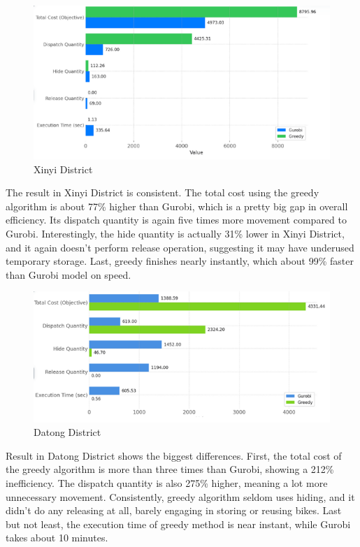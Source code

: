 \documentclass[11pt,a4paper]{article}
\begin{document}
\newpage
\begin{figure}[H]
\centering
\includegraphics{Xinyi.png}
\caption{Xinyi District}
\label{Figure 2}
\end{figure}

The result in Xinyi District is consistent. The total cost using the greedy algorithm is about 77\% higher than Gurobi, which is a pretty big gap in overall efficiency. Its dispatch quantity is again five times more movement compared to Gurobi.
Interestingly, the hide quantity is actually 31\% lower in Xinyi District, and it again doesn't perform release operation, suggesting it may have underused temporary storage. Last, greedy finishes nearly instantly, which about 99\% faster than Gurobi model on speed.

\begin{figure}[H]
\centering
\includegraphics{Datong.png}
\caption{Datong District}
\label{Figure 3}
\end{figure}

Result in Datong District shows the biggest differences. First, the total cost of the greedy algorithm is more than three times than Gurobi, showing a 212\% inefficiency. The dispatch quantity is also 275\% higher, meaning a lot more unnecessary movement. Consistently, greedy algorithm seldom uses hiding, and it didn't do any releasing at all, barely engaging in storing or reusing bikes. Last but not least, the execution time of greedy method is near instant, while Gurobi takes about 10 minutes.
\end{document}
